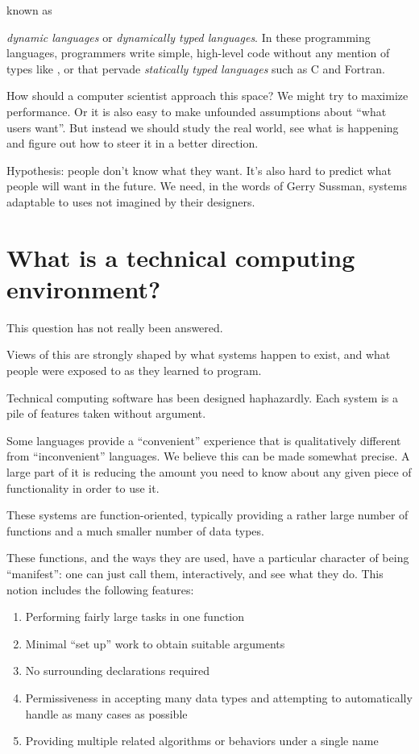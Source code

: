 known as { {\it dynamic languages} or {\it dynamically typed languages}.
In these programming
languages, programmers write simple, high-level code without any
mention of types like ,  or  that
pervade {\it statically typed languages} such as  C and Fortran.



How should a computer scientist approach this space? We might try to
maximize performance. Or it is also easy to make unfounded assumptions about
``what users want''. But instead we should study the real world, see
what is happening and figure out how to steer it in a better direction.

Hypothesis: people don't know what they want. It's also hard to
predict what people will want in the future. We need, in the words
of Gerry Sussman, systems adaptable to uses not imagined by their
designers.

\section{What is a technical computing environment?}

This question has not really been answered.

Views of this are strongly shaped by what systems happen to exist,
and what people were exposed to as they learned to program.

Technical computing software has been designed haphazardly. Each system
is a pile of features taken without argument.


Some languages provide a ``convenient'' experience that is
qualitatively different from ``inconvenient'' languages. We believe
this can be made somewhat precise. A large part of it is reducing the
amount you need to know about any given piece of functionality in order
to use it.


These systems are function-oriented, typically providing a rather
large number of functions and a much smaller number of data types.

These functions, and the ways they are used, have a particular
character of being ``manifest'': one can just call them,
interactively, and see what they do. This notion includes the
following features:

\vspace{-3ex}
\begin{singlespace}
\begin{enumerate}
\item Performing fairly large tasks in one function
\item Minimal ``set up'' work to obtain suitable arguments
\item No surrounding declarations required
\item Permissiveness in accepting many data types and attempting to
      automatically handle as many cases as possible
\item Providing multiple related algorithms or behaviors under a single name
\end{enumerate}
\end{singlespace}

}

